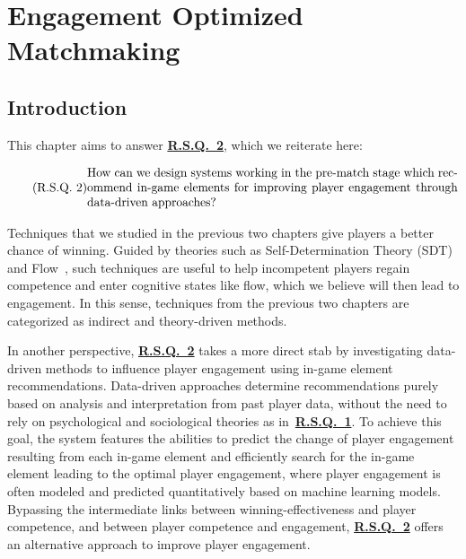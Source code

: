 \chapter{Engagement Optimized Matchmaking} 

\label{chapter:eomm} 

\section{Introduction}\label{sec:eomm_intro}
This chapter aims to answer \hyperref[rq2]{\textbf{R.S.Q.~2}}, which we reiterate here:

\begin{equation}
  \tag{R.S.Q.~2}\label{rq2}
  \parbox{\dimexpr\linewidth-4em}{%
    \strut
    How can we design systems working in the pre-match stage which recommend in-game elements for improving player engagement through data-driven approaches?
    \strut
  }
\end{equation}

Techniques that we studied in the previous two chapters give players a better chance of winning. Guided by theories such as Self-Determination Theory (SDT)~\citep{ryan2000self} and Flow~\citep{flow1990psychology}, such techniques are useful to help incompetent players regain competence and enter cognitive states like flow, which we believe will then lead to engagement. In this sense, techniques from the previous two chapters are categorized as indirect and theory-driven methods.

In another perspective, \hyperref[rq2]{\textbf{R.S.Q.~2}} takes a more direct stab by investigating data-driven methods to influence player engagement using in-game element recommendations. Data-driven approaches determine recommendations purely based on analysis and interpretation from past player data, without the need to rely on psychological and sociological theories as in~\hyperref[rq1]{\textbf{R.S.Q.~1}}.
To achieve this goal, the system features the abilities to predict the change of player engagement resulting from each in-game element and efficiently search for the in-game element leading to the optimal player engagement, where player engagement is often modeled and predicted quantitatively based on machine learning models. Bypassing the intermediate links between winning-effectiveness and player competence, and between player competence and engagement, \hyperref[rq2]{\textbf{R.S.Q.~2}} offers an alternative approach to improve player engagement.



